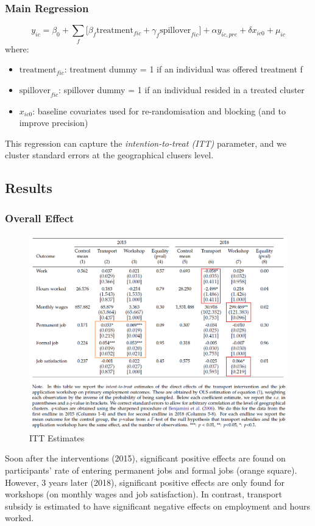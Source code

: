         \subsubsection{Main Regression}
            \begin{equation*}
                y_{ic} = \beta_0 + \sum_{f} \big[ \beta_f \text{treatment}_{fic} + \gamma_f \text{spillover}_{fic} \big] + \alpha y_{ic, pre} + \delta x_{ic0} + \mu_{ic}
            \end{equation*}
            where:
            \begin{itemize}
                \item $\text{treatment}_{fic}$: treatment dummy = 1 if an individual was offered treatment f
                \item $\text{spillover}_{fic}$: spillover dummy = 1 if an individual resided in a treated cluster
                \item $x_{ic0}$: baseline covariates used for re-randomisation and blocking (and to improve precision)
            \end{itemize}
            This regression can capture the \emph{intention-to-treat (ITT)} parameter, and we cluster standard errors at the geographical clusers level.
            
    \subsection{Results}
    
        \subsubsection{Overall Effect}
            \begin{figure}[H]
                \centering
                \includegraphics[width=5in]{images/ch6/Abebe result 1.png}
                \caption{ITT Estimates}
            \end{figure}
            Soon after the interventions (2015), significant positive effects are found on participants' rate of entering permanent jobs and formal jobs (orange square). However, 3 years later (2018), significant positive effects are only found for workshops (on monthly wages and job satisfaction). In contrast, transport subsidy is estimated to have significant negative effects on employment and hours worked.
            
